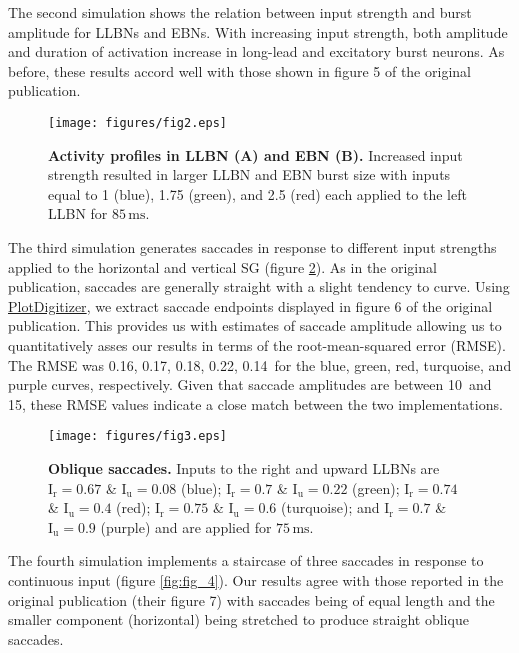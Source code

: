 \documentclass[10pt,a4paper,onecolumn]{article}
\renewcommand{\includegraphics}[2][]{\OldIncludegraphics[width=12cm, #1]{#2}}
\begin{document}
The second simulation shows the relation between input strength and
burst amplitude for LLBNs and EBNs. With increasing input strength, both
amplitude and duration of activation increase in long-lead and
excitatory burst neurons. As before, these results accord well with
those shown in figure 5 of the original publication.

\begin{figure}
\centering
\texttt{[image: figures/fig2.eps]}
\caption{\textbf{Activity profiles in LLBN (A) and EBN (B).} Increased
input strength resulted in larger LLBN and EBN burst size with inputs
equal to 1 (blue), 1.75 (green), and 2.5 (red) each applied to the left
LLBN for \(85\,\mathrm{ms}\).\label{fig:fig_2}}
\end{figure}

The third simulation generates saccades in response to different input
strengths applied to the horizontal and vertical SG (figure
\ref{fig:fig_3}). As in the original publication, saccades are generally
straight with a slight tendency to curve. Using
\href{http://plotdigitizer.sourceforge.net/}{PlotDigitizer}, we extract
saccade endpoints displayed in figure 6 of the original publication.
This provides us with estimates of saccade amplitude allowing us to
quantitatively asses our results in terms of the root-mean-squared error
(RMSE). The RMSE was 0.16\textdegree, 0.17\textdegree, 0.18\textdegree,
0.22\textdegree, 0.14\textdegree~for the blue, green, red, turquoise,
and purple curves, respectively. Given that saccade amplitudes are
between 10\textdegree~and 15\textdegree, these RMSE values indicate a
close match between the two implementations.

\begin{figure}
\centering
\texttt{[image: figures/fig3.eps]}
\caption{\textbf{Oblique saccades.} Inputs to the right and upward LLBNs
are \(\mathrm{{I}_{r}=0.67}\) \& \(\mathrm{{I}_{u}=0.08}\) (blue);
\(\mathrm{{I}_{r}=0.7}\) \& \(\mathrm{{I}_{u}=0.22}\) (green);
\(\mathrm{{I}_{r}=0.74}\) \& \(\mathrm{{I}_{u}=0.4}\) (red);
\(\mathrm{{I}_{r}=0.75}\) \& \(\mathrm{{I}_{u}=0.6}\) (turquoise); and
\(\mathrm{{I}_{r}=0.7}\) \& \(\mathrm{{I}_{u}=0.9}\) (purple) and are
applied for \(75\,\mathrm{ms}\).\label{fig:fig_3}}
\end{figure}

The fourth simulation implements a staircase of three saccades in
response to continuous input (figure \ref{fig:fig_4}). Our results agree
with those reported in the original publication (their figure 7) with
saccades being of equal length and the smaller component (horizontal)
being stretched to produce straight oblique saccades.
\end{document}
